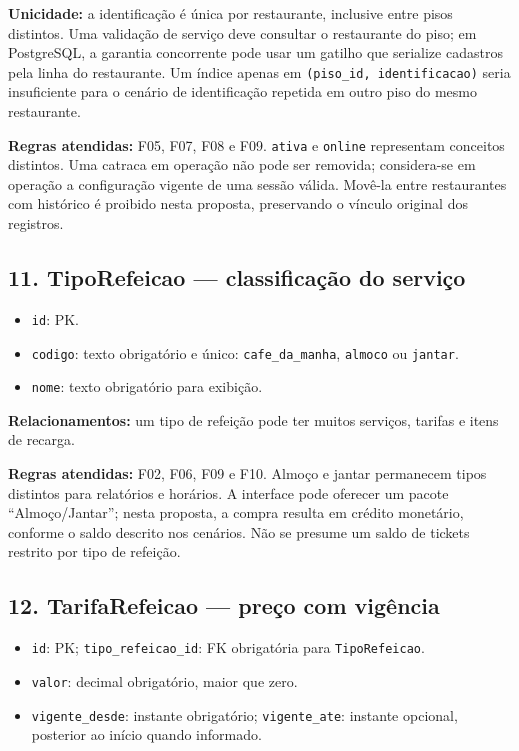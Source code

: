 \documentclass[
  brazilian,
  12pt,
  a4paper,
]{article}
\providecommand{\tightlist}{%
  \setlength{\itemsep}{0pt}\setlength{\parskip}{0pt}}
\begin{document}
\textbf{Unicidade:} a identificação é única por restaurante, inclusive
entre pisos distintos. Uma validação de serviço deve consultar o
restaurante do piso; em PostgreSQL, a garantia concorrente pode usar um
gatilho que serialize cadastros pela linha do restaurante. Um índice
apenas em \texttt{(piso\_id,\ identificacao)} seria insuficiente para o
cenário de identificação repetida em outro piso do mesmo restaurante.

\textbf{Regras atendidas:} F05, F07, F08 e F09. \texttt{ativa} e
\texttt{online} representam conceitos distintos. Uma catraca em operação
não pode ser removida; considera-se em operação a configuração vigente
de uma sessão válida. Movê-la entre restaurantes com histórico é
proibido nesta proposta, preservando o vínculo original dos registros.

\subsection{11. TipoRefeicao --- classificação do
serviço}\label{tiporefeicao-classificauxe7uxe3o-do-serviuxe7o}

\begin{itemize}
\tightlist
\item
  \texttt{id}: PK.
\item
  \texttt{codigo}: texto obrigatório e único: \texttt{cafe\_da\_manha},
  \texttt{almoco} ou \texttt{jantar}.
\item
  \texttt{nome}: texto obrigatório para exibição.
\end{itemize}

\textbf{Relacionamentos:} um tipo de refeição pode ter muitos serviços,
tarifas e itens de recarga.

\textbf{Regras atendidas:} F02, F06, F09 e F10. Almoço e jantar
permanecem tipos distintos para relatórios e horários. A interface pode
oferecer um pacote ``Almoço/Jantar''; nesta proposta, a compra resulta
em crédito monetário, conforme o saldo descrito nos cenários. Não se
presume um saldo de tickets restrito por tipo de refeição.

\subsection{12. TarifaRefeicao --- preço com
vigência}\label{tarifarefeicao-preuxe7o-com-viguxeancia}

\begin{itemize}
\tightlist
\item
  \texttt{id}: PK; \texttt{tipo\_refeicao\_id}: FK obrigatória para
  \texttt{TipoRefeicao}.
\item
  \texttt{valor}: decimal obrigatório, maior que zero.
\item
  \texttt{vigente\_desde}: instante obrigatório; \texttt{vigente\_ate}:
  instante opcional, posterior ao início quando informado.
\end{itemize}
\end{document}
